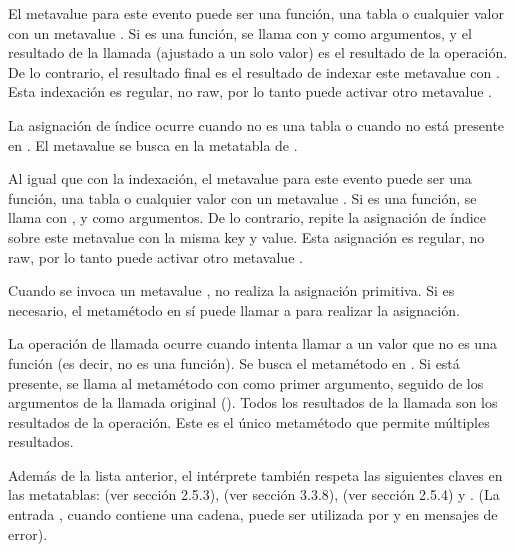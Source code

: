 \begin{description}
	El metavalue para este evento puede ser una función, una tabla o cualquier valor con un metavalue . Si es una función, se llama con  y  como argumentos, y el resultado de la llamada (ajustado a un solo valor) es el resultado de la operación. De lo contrario, el resultado final es el resultado de indexar este metavalue con . Esta indexación es regular, no raw, por lo tanto puede activar otro metavalue .

	 La asignación de índice  ocurre cuando  no es una tabla o cuando  no está presente en . El metavalue se busca en la metatabla de .

	Al igual que con la indexación, el metavalue para este evento puede ser una función, una tabla o cualquier valor con un metavalue . Si es una función, se llama con ,  y  como argumentos. De lo contrario,  repite la asignación de índice sobre este metavalue con la misma key y value. Esta asignación es regular, no raw, por lo tanto puede activar otro metavalue .

	Cuando se invoca un metavalue ,  no realiza la asignación primitiva. Si es necesario, el metamétodo en sí puede llamar a \textcolor{blue!80}{} para realizar la asignación.

	 La operación de llamada  ocurre cuando  intenta llamar a un valor que no es una función (es decir,  no es una función). Se busca el metamétodo en . Si está presente, se llama al metamétodo con  como primer argumento, seguido de los argumentos de la llamada original (). Todos los resultados de la llamada son los resultados de la operación. Este es el único metamétodo que permite múltiples resultados.

\end{description}

\vspace{0.5cm} %

Además de la lista anterior, el intérprete también respeta las siguientes claves en las metatablas:  (ver sección 2.5.3),  (ver sección 3.3.8),  (ver sección 2.5.4) y . (La entrada , cuando contiene una cadena, puede ser utilizada por  y en mensajes de error).

